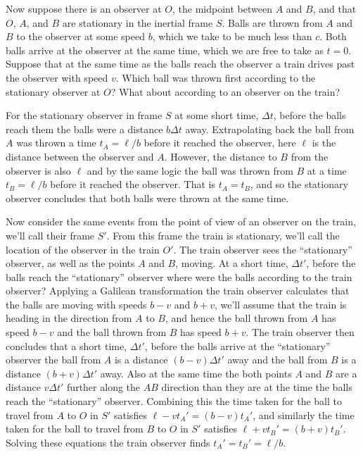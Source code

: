 \documentclass[fleqn]{NotesClass}
\begin{document}
    Now suppose there is an observer at \(O\), the midpoint between \(A\) and \(B\), and that \(O\), \(A\), and \(B\) are stationary in the inertial frame \(S\).
    Balls are thrown from \(A\) and \(B\) to the observer at some speed \(b\), which we take to be much less than \(c\).
    Both balls arrive at the observer at the same time, which we are free to take as \(t = 0\).
    Suppose that at the same time as the balls reach the observer a train drives past the observer with speed \(v\).
    Which ball was thrown first according to the stationary observer at \(O\)?
    What about according to an observer on the train?
    
    For the stationary observer in frame \(S\) at some short time, \(\Delta t\), before the balls reach them the balls were a distance \(b\Delta t\) away.
    Extrapolating back the ball from \(A\) was thrown a time \(t_A = \ell/b\) before it reached the observer, here \(\ell\) is the distance between the observer and \(A\).
    However, the distance to \(B\) from the observer is also \(\ell\) and by the same logic the ball was thrown from \(B\) at a time \(t_B = \ell/b\) before it reached the observer.
    That is \(t_A = t_B\), and so the stationary observer concludes that both balls were thrown at the same time.
    
    Now consider the same events from the point of view of an observer on the train, we'll call their frame \(S'\).
    From this frame the train is stationary, we'll call the location of the observer in the train \(O'\).
    The train observer sees the \enquote{stationary} observer, as well as the points \(A\) and \(B\), moving.
    At a short time, \(\Delta t'\), before the balls reach the \enquote{stationary} observer where were the balls according to the train observer?
    Applying a Galilean transformation the train observer calculates that the balls are moving with speeds \(b - v\) and \(b + v\), we'll assume that the train is heading in the direction from \(A\) to \(B\), and hence the ball thrown from \(A\) has speed \(b - v\) and the ball thrown from \(B\) has speed \(b + v\).
    The train observer then concludes that a short time, \(\Delta t'\), before the balls arrive at the \enquote{stationary} observer the ball from \(A\) is a distance \((b - v)\Delta t'\) away and the ball from \(B\) is a distance \((b + v)\Delta t'\) away.
    Also at the same time the both points \(A\) and \(B\) are a distance \(v\Delta t'\) further along the \(AB\) direction than they are at the time the balls reach the \enquote{stationary} observer.
    Combining this the time taken for the ball to travel from \(A\) to \(O\) in \(S'\) satisfies \(\ell - vt_A' = (b - v)t_A'\), and similarly the time taken for the ball to travel from \(B\) to \(O\) in \(S'\) satisfies \(\ell + vt_B' = (b + v)t_B'\).
    Solving these equations the train observer finds \(t_A' = t_B' = \ell/b\).
    
\end{document}
